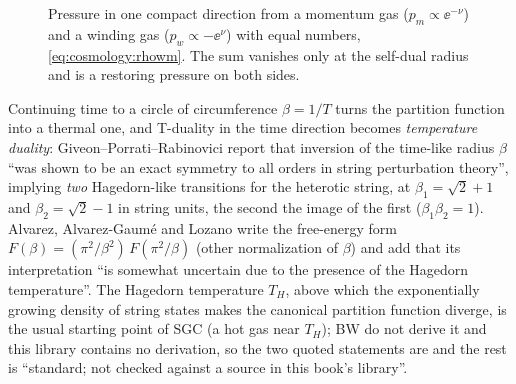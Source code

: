\begin{figure}[t]
\centering
{}
\caption{Pressure in one compact direction from a momentum gas ($p_m\propto\ee^{-\nu}$) and a
winding gas ($p_w\propto-\ee^{\nu}$) with equal numbers, \eqref{eq:cosmology:rhowm}. The sum
vanishes only at the self-dual radius and is a restoring pressure on both sides.}
\label{fig:cosmology:pressure}
\end{figure}

\begin{physicsbox}
Continuing time to a circle of circumference $\beta=1/T$ turns the partition function into a
thermal one, and T-duality in the time direction becomes \emph{temperature
duality}: Giveon--Porrati--Rabinovici report that inversion of
the time-like radius $\beta$ ``was shown to be an exact symmetry to all orders in string
perturbation theory'', implying \emph{two} Hagedorn-like transitions for the heterotic
string, at $\beta_1=\sqrt2+1$ and $\beta_2=\sqrt2-1$ in string units, the second the image
of the first ($\beta_1\beta_2=1$).  Alvarez, Alvarez-Gaum\'e and
Lozano write the free-energy form $F(\beta)=(\pi^2/\beta^2)\,F(\pi^2/\beta)$ (other
normalization of $\beta$) and add that its interpretation ``is somewhat uncertain due to the
presence of the Hagedorn temperature''.  The Hagedorn
temperature $T_H$, above which the exponentially growing density
of string states makes the canonical partition function diverge, is the usual starting
point of SGC (a hot gas near $T_H$); BW do not derive it and this library contains no
derivation, so the two quoted statements are \TL{} and the rest is ``standard; not checked
against a source in this book's library''.
\end{physicsbox}

